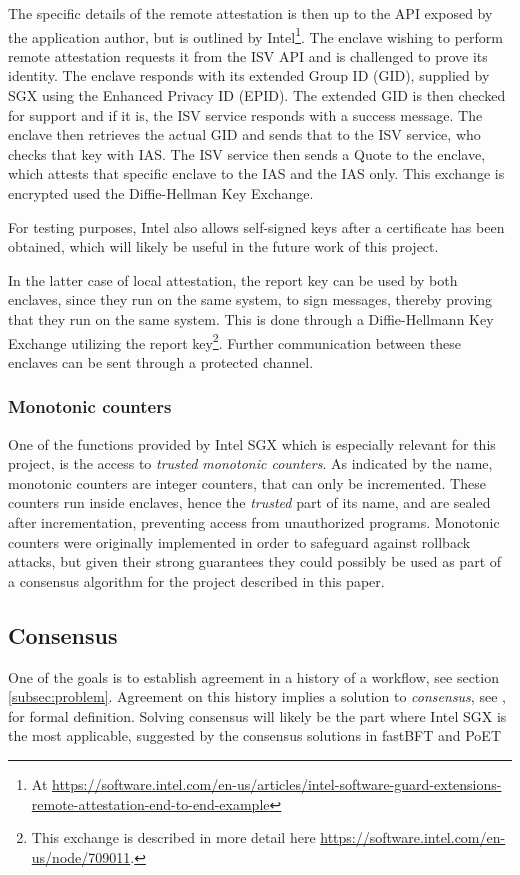 \documentclass[12pt]{article}
\begin{document}
			The specific details of the remote attestation is then up to the API exposed by the application author, but is outlined by Intel\footnote{At \url{https://software.intel.com/en-us/articles/intel-software-guard-extensions-remote-attestation-end-to-end-example}}.
			The enclave wishing to perform remote attestation requests it from the ISV API and is challenged to prove its identity.
			The enclave responds with its extended Group ID (GID), supplied by SGX using the Enhanced Privacy ID (EPID).
			The extended GID is then checked for support and if it is, the ISV service responds with a success message.
			The enclave then retrieves the actual GID and sends that to the ISV service, who checks that key with IAS.
			The ISV service then sends a Quote to the enclave, which attests that specific enclave to the IAS and the IAS only.
			This exchange is encrypted used the Diffie-Hellman Key Exchange. 

			For testing purposes, Intel also allows self-signed keys after a certificate has been obtained, which will likely be useful in the future work of this project.

			In the latter case of local attestation, the report key can be used by both enclaves, since they run on the same system, to sign messages, thereby proving that they run on the same system.
			This is done through a Diffie-Hellmann Key Exchange utilizing the report key\footnote{This exchange is described in more detail here \url{https://software.intel.com/en-us/node/709011}.}.
			Further communication between these enclaves can be sent through a protected channel.

			\subsubsection{Monotonic counters}
			One of the functions provided by Intel SGX which is especially relevant for this project, is the access to \textit{trusted monotonic counters}.
			As indicated by the name, monotonic counters are integer counters, that can only be incremented.
			These counters run inside enclaves, hence the \textit{trusted} part of its name, and are sealed after incrementation, preventing access from unauthorized programs.
			Monotonic counters were originally implemented in order to safeguard against rollback attacks, but given their strong guarantees they could possibly be used as part of a consensus algorithm for the project described in this paper.

		\subsection{Consensus}
		One of the goals is to establish agreement in a history of a workflow, see section \ref{subsec:problem}. Agreement on this history implies a solution to \textit{consensus}, see \cite{mds-book}, for formal definition.
		Solving consensus will likely be the part where Intel SGX is the most applicable, suggested by the consensus solutions in fastBFT \cite{fastbft} and PoET \cite{poet}
\end{document}
